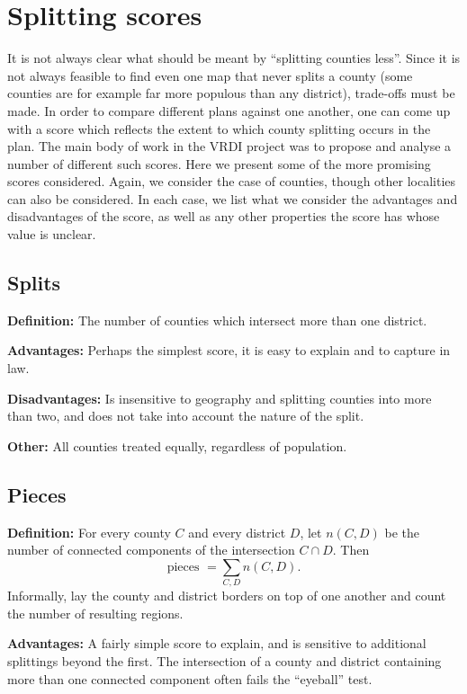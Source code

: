 \documentclass{mgggarticle}
\begin{document}
\section{Splitting scores}
It is not always clear what should be meant by ``splitting counties less''. Since it is not always feasible to find even one map that never splits a county (some counties are for example far more populous than any district), trade-offs must be made. In order to compare different plans against one another, one can come up with a score which reflects the extent to which county splitting occurs in the plan. The main body of work in the VRDI project was to propose and analyse a number of different such scores. Here we present some of the more promising scores considered. Again, we consider the case of counties, though other localities can also be considered. In each case, we list what we consider the advantages and disadvantages of the score, as well as any other properties the score has whose value is unclear.

\subsection{Splits}
\textbf{Definition: } The number of counties which intersect more than one district.

\textbf{Advantages:} Perhaps the simplest score, it is easy to explain and to capture in law.

\textbf{Disadvantages:} Is insensitive to geography and splitting counties into more than two, and does not take into account the nature of the split.

\textbf{Other: } All counties treated equally, regardless of population.


\subsection{Pieces}
\textbf{Definition: } For every county $C$ and every district $D$, let $n(C,D)$ be the number of connected components of the intersection $C \cap D$. Then
$$
\text{pieces } = \sum_{C, D} n(C,D).
$$ 
Informally, lay the county and district borders on top of one another and count the number of resulting regions.

\textbf{Advantages:} A fairly simple score to explain, and is sensitive to additional splittings beyond the first. The intersection of a county and district containing more than one connected component often fails the ``eyeball'' test.
\end{document}
